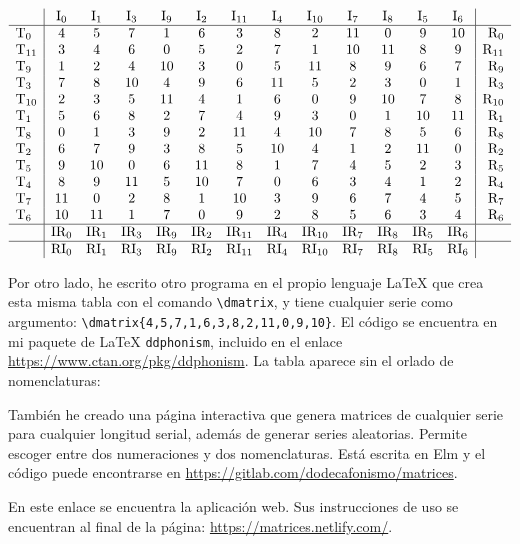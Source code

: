 		\[\begin{array}{l|cccccccccccc|r}
		&\mbox{I}_{0}&\mbox{I}_{1}&\mbox{I}_{3}&\mbox{I}_{9}&\mbox{I}_{2}&\mbox{I}_{11}&\mbox{I}_{4}&\mbox{I}_{10}&\mbox{I}_{7}&\mbox{I}_{8}&\mbox{I}_{5}&\mbox{I}_{6}&\\
		\hline
		\mbox{T}_{0}&4&5&7&1&6&3&8&2&11&0&9&10&\mbox{R}_{0}\\
		\mbox{T}_{11}&3&4&6&0&5&2&7&1&10&11&8&9&\mbox{R}_{11}\\
		\mbox{T}_{9}&1&2&4&10&3&0&5&11&8&9&6&7&\mbox{R}_{9}\\
		\mbox{T}_{3}&7&8&10&4&9&6&11&5&2&3&0&1&\mbox{R}_{3}\\
		\mbox{T}_{10}&2&3&5&11&4&1&6&0&9&10&7&8&\mbox{R}_{10}\\
		\mbox{T}_{1}&5&6&8&2&7&4&9&3&0&1&10&11&\mbox{R}_{1}\\
		\mbox{T}_{8}&0&1&3&9&2&11&4&10&7&8&5&6&\mbox{R}_{8}\\
		\mbox{T}_{2}&6&7&9&3&8&5&10&4&1&2&11&0&\mbox{R}_{2}\\
		\mbox{T}_{5}&9&10&0&6&11&8&1&7&4&5&2&3&\mbox{R}_{5}\\
		\mbox{T}_{4}&8&9&11&5&10&7&0&6&3&4&1&2&\mbox{R}_{4}\\
		\mbox{T}_{7}&11&0&2&8&1&10&3&9&6&7&4&5&\mbox{R}_{7}\\
		\mbox{T}_{6}&10&11&1&7&0&9&2&8&5&6&3&4&\mbox{R}_{6}\\
		\hline
		&\mbox{IR}_{0}&\mbox{IR}_{1}&\mbox{IR}_{3}&\mbox{IR}_{9}&\mbox{IR}_{2}&\mbox{IR}_{11}&\mbox{IR}_{4}&\mbox{IR}_{10}&\mbox{IR}_{7}&\mbox{IR}_{8}&\mbox{IR}_{5}&\mbox{IR}_{6}&\\
		\hline
		&\mbox{RI}_{0}&\mbox{RI}_{1}&\mbox{RI}_{3}&\mbox{RI}_{9}&\mbox{RI}_{2}&\mbox{RI}_{11}&\mbox{RI}_{4}&\mbox{RI}_{10}&\mbox{RI}_{7}&\mbox{RI}_{8}&\mbox{RI}_{5}&\mbox{RI}_{6}&
		\end{array}\]
	
		Por otro lado, he escrito otro programa en el propio lenguaje \LaTeX{} que crea esta misma tabla con el comando \verb|\dmatrix|, y tiene cualquier serie como argumento: \verb|\dmatrix{4,5,7,1,6,3,8,2,11,0,9,10}|. %
		El código se encuentra en mi paquete de \LaTeX{} \texttt{ddphonism}, incluido en el enlace  \url{https://www.ctan.org/pkg/ddphonism}.
		La tabla aparece sin el orlado de nomenclaturas:
		
		
		También he creado una página interactiva que genera matrices de cualquier serie para cualquier longitud serial, además de generar series aleatorias. Permite escoger entre dos numeraciones y dos nomenclaturas. Está escrita en Elm y el código puede encontrarse en \url{https://gitlab.com/dodecafonismo/matrices}.
		
			
			En este enlace se encuentra la aplicación web. Sus instrucciones de uso se encuentran al final de la página: \url{https://matrices.netlify.com/}.